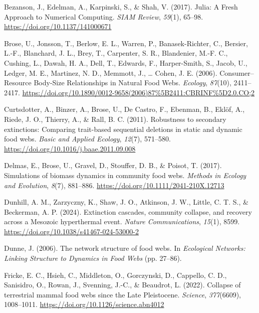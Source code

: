 \documentclass[
]{article}
\newlength{\cslhangindent}
\newenvironment{CSLReferences}[2] %
 {\begin{list}{}{%
  \setlength{\itemindent}{0pt}
  \setlength{\leftmargin}{0pt}
  \setlength{\parsep}{0pt}
  \ifodd #1
   \setlength{\leftmargin}{\cslhangindent}
   \setlength{\itemindent}{-1\cslhangindent}
  \fi
  \setlength{\itemsep}{#2\baselineskip}}}
 {\end{list}}
\begin{document}
\protect{}\label{refs}
\begin{CSLReferences}{1}{0}
Bezanson, J., Edelman, A., Karpinski, S., \& Shah, V. (2017). Julia: {A
Fresh Approach} to {Numerical Computing}. \emph{SIAM Review},
\emph{59}(1), 65--98. \url{https://doi.org/10.1137/141000671}

Brose, U., Jonsson, T., Berlow, E. L., Warren, P., Banasek-Richter, C.,
Bersier, L.-F., Blanchard, J. L., Brey, T., Carpenter, S. R.,
Blandenier, M.-F. C., Cushing, L., Dawah, H. A., Dell, T., Edwards, F.,
Harper-Smith, S., Jacob, U., Ledger, M. E., Martinez, N. D., Memmott,
J., \ldots{} Cohen, J. E. (2006). Consumer--{Resource Body-Size
Relationships} in {Natural Food Webs}. \emph{Ecology}, \emph{87}(10),
2411--2417.
\url{https://doi.org/10.1890/0012-9658(2006)87\%5B2411:CBRINF\%5D2.0.CO;2}

Curtsdotter, A., Binzer, A., Brose, U., De Castro, F., Ebenman, B.,
Eklöf, A., Riede, J. O., Thierry, A., \& Rall, B. C. (2011). Robustness
to secondary extinctions: {Comparing} trait-based sequential deletions
in static and dynamic food webs. \emph{Basic and Applied Ecology},
\emph{12}(7), 571--580. \url{https://doi.org/10.1016/j.baae.2011.09.008}

Delmas, E., Brose, U., Gravel, D., Stouffer, D. B., \& Poisot, T.
(2017). Simulations of biomass dynamics in community food webs.
\emph{Methods in Ecology and Evolution}, \emph{8}(7), 881--886.
\url{https://doi.org/10.1111/2041-210X.12713}

Dunhill, A. M., Zarzyczny, K., Shaw, J. O., Atkinson, J. W., Little, C.
T. S., \& Beckerman, A. P. (2024). Extinction cascades, community
collapse, and recovery across a {Mesozoic} hyperthermal event.
\emph{Nature Communications}, \emph{15}(1), 8599.
\url{https://doi.org/10.1038/s41467-024-53000-2}

Dunne, J. (2006). The network structure of food webs. In
\emph{Ecological {Networks}: {Linking Structure} to {Dynamics} in {Food
Webs}} (pp. 27--86).

Fricke, E. C., Hsieh, C., Middleton, O., Gorczynski, D., Cappello, C.
D., Sanisidro, O., Rowan, J., Svenning, J.-C., \& Beaudrot, L. (2022).
Collapse of terrestrial mammal food webs since the {Late Pleistocene}.
\emph{Science}, \emph{377}(6609), 1008--1011.
\url{https://doi.org/10.1126/science.abn4012}


\end{CSLReferences}
\end{document}
